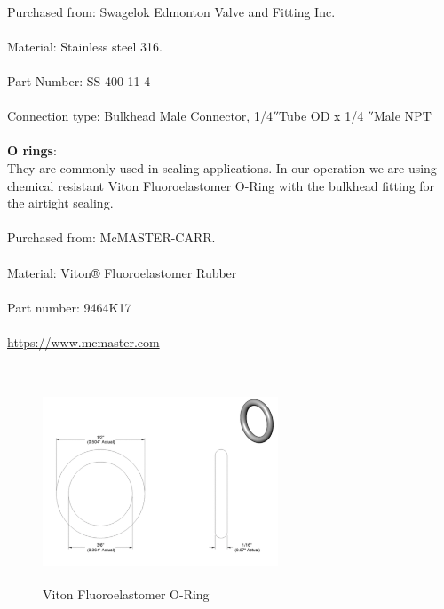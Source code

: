 \\
Purchased from: Swagelok Edmonton Valve and Fitting Inc.\\
\\
Material: Stainless steel 316.   \\                           
\\
Part Number: SS-400-11-4\\
\\
Connection type: Bulkhead Male Connector, 1/4$''$Tube OD x 1/4 $''$Male NPT\\
\\
\textbf{O rings}: 
\\
They are commonly used in sealing applications. In our operation we are using chemical resistant Viton Fluoroelastomer O-Ring with the bulkhead fitting for the airtight sealing.\\
\\
Purchased from: McMASTER-CARR.\\
\\
Material: Viton® Fluoroelastomer Rubber\\                                
\\
Part number: 9464K17\\
\\
\url{https://www.mcmaster.com}\\
\\
\begin{figure}[!htpb]
  \centering
  \includegraphics[width = 7cm, height=6cm ]{figures/oring1}
  \caption{Viton Fluoroelastomer O-Ring}
  \label{fig:oring}
\end{figure}
\\
